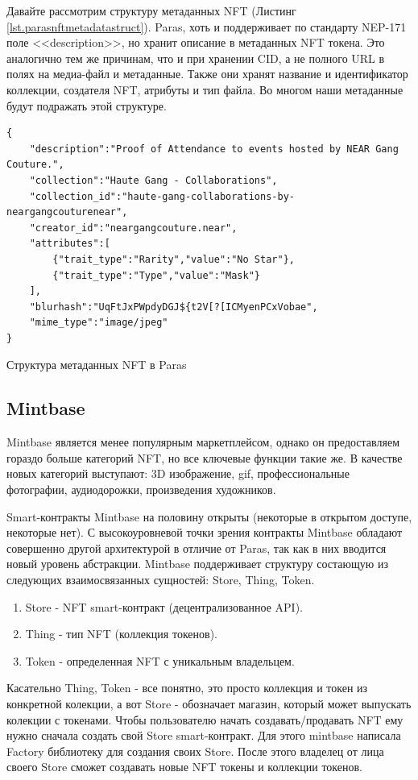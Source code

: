 Давайте рассмотрим структуру метаданных NFT (Листинг {\color{blue}\ref{lst.parasnftmetadatastruct}}). Paras, хоть и поддерживает по стандарту NEP-171 поле <<description>>, но хранит описание в метаданных NFT токена. Это аналогично тем же причинам, что и при хранении CID, а не полного URL в полях на медиа-файл и метаданные. Также они хранят название и идентификатор коллекции, создателя NFT, атрибуты и тип файла. Во многом наши метаданные будут подражать этой структуре.

\begin{listing}
\begin{verbatim}
{
    "description":"Proof of Attendance to events hosted by NEAR Gang Couture.",
    "collection":"Haute Gang - Collaborations",
    "collection_id":"haute-gang-collaborations-by-neargangcouturenear",
    "creator_id":"neargangcouture.near",
    "attributes":[
        {"trait_type":"Rarity","value":"No Star"},
        {"trait_type":"Type","value":"Mask"}
    ],
    "blurhash":"UqFtJxPWpdyDGJ${t2V[?[ICMyenPCxVobae",
    "mime_type":"image/jpeg"
}
\end{verbatim}
\caption{Структура метаданных NFT в Paras}
\label{lst.parasnftmetadatastruct}
\end{listing}


\subsection{Mintbase}

Mintbase является менее популярным маркетплейсом, однако он предоставляем гораздо больше категорий NFT, но все ключевые функции такие же. В качестве новых категорий выступают: 3D изображение, gif, профессиональные фотографии, аудиодорожки, произведения художников.

Smart-контракты Mintbase на половину открыты (некоторые в открытом доступе, некоторые нет)\cite{mintbasecontracts}. С высокоуровневой точки зрения контракты Mintbase обладают совершенно другой архитектурой в отличие от Paras, так как в них вводится новый уровень абстракции.
Mintbase поддерживает структуру состающую из следующих взаимосвязанных сущностей: Store, Thing, Token.
\begin{enumerate}
    \item Store - NFT smart-контракт (децентрализованное API).
    \item Thing - тип NFT (коллекция токенов).
    \item Token - определенная NFT с уникальным владельцем.
\end{enumerate}
Касательно Thing, Token - все понятно, это просто коллекция и токен из конкретной колекции, а вот Store - обозначает магазин, который может выпускать колекции с токенами.
Чтобы пользователю начать создавать/продавать NFT ему нужно сначала создать свой Store smart-контракт. Для этого mintbase написала Factory библиотеку для создания своих Store.
После этого владелец от лица своего Store сможет создавать новые NFT токены и коллекции токенов.

